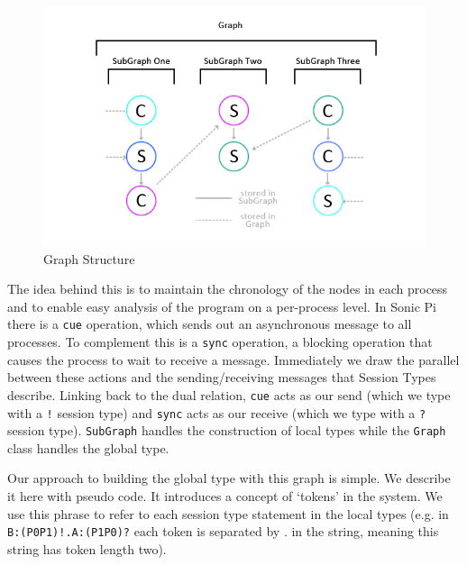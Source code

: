 \documentclass[11pt, abstracton, twoside, titlepage=true]{scrartcl}
\begin{document}
\begin{figure}[h!]
	\centering
	\includegraphics[width=\textwidth]{images/GSG.jpg}
	\caption{Graph Structure} \label{graphStructure}
\end{figure}

The idea behind this is to maintain the chronology of the nodes in each process and 
to enable easy analysis of the program on a per-process level. In Sonic Pi there is 
a \texttt{cue} operation, which sends out an asynchronous message to all processes. 
To complement this is a \texttt{sync} operation, a blocking operation that causes 
the process to wait to receive a message. Immediately we draw the parallel between 
these actions and the sending/receiving messages that Session Types describe. 
Linking back to the dual relation, \texttt{cue} acts as our send (which we type with a
\texttt{!} session type) and 
\texttt{sync} acts as our receive (which we type with a \texttt{?} session type). \texttt{SubGraph} handles the construction 
of local types while the \texttt{Graph} class handles the global type.

Our approach to building the global type with this graph is simple. We describe it 
here with pseudo code. It introduces a concept of `tokens' in the system. We use this 
phrase to refer to each session type statement in the local types (e.g. in 
\texttt{B:(P0P1)!.A:(P1P0)?} each token is separated by . in the string, meaning 
this string has token length two).
\end{document}
